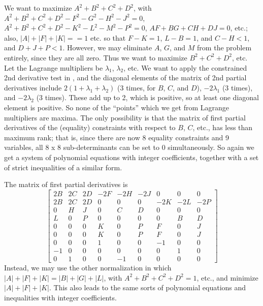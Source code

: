 We want to maximize $A^2+B^2+C^2+D^2$, with $A^2+B^2+C^2+D^2-F^2-G^2-H^2-J^2
= 0$, $A^2+B^2+C^2+D^2-K^2-L^2-M^2-P^2 = 0$, $AF+BG+CH+DJ= 0$, etc.;
also, $|A|+|F|+|K| = = 1$ etc.
so that $F-K = 1$, $L-B = 1$, and $C-H < 1$, and $D+J+P < 1$. However, we
may eliminate $A$, $G$, and $M$ from the problem entirely, since they are all
zero. Thus we want to maximize $B^2+C^2+D^2$, etc. Let the Lagrange
multipliers be $\lambda_1$, $\lambda_2$, etc. We want to apply the constrained
2nd derivative test in \cite{fleming1965}, and the diagonal elements of the
matrix of 2nd partial derivatives include $2(1 + \lambda_1 + \lambda_2)$
(3 times, for $B$, $C$, and $D$), $-2\lambda_1$ (3 times), and $-2\lambda_2$
(3 times).  These add up to 2, which is positive, so at
least one diagonal element is positive. So none of the ``points'' which we
get from Lagrange multipliers are maxima. The only possibility is that
the matrix of first partial derivatives of the (equality) constraints with
respect to $B$, $C$, etc., has less than maximum rank; that is, since there are
now 8 equality constraints and 9 variables, all 8 x 8 sub-determinants can
be set to 0 simultaneously. So again we get a system of polynomial
equations with integer coefficients, together with a set of strict
inequalities of a similar form.

The matrix of first partial derivatives is
\begin{equation*}
\left[
\begin{array}{rrrrrrrrr}
2B & 2C & 2D & -2F & -2H & -2J &   0 &   0 &   0 \\
2B & 2C & 2D &   0 &   0 &   0 & -2K & -2L & -2P \\
 0 &  H &  J &   0 &   C &   D &   0 &   0 &   0 \\
 L &  0 &  P &   0 &   0 &   0 &   0 &   B &   D \\
 0 &  0 &  0 &   K &   0 &   P &   F &   0 &   J \\
 0 &  0 &  0 &   K &   0 &   P &   F &   0 &   J \\
 0 &  0 &  0 &   1 &   0 &   0 &  -1 &   0 &   0 \\
-1 &  0 &  0 &   0 &   0 &   0 &   0 &   1 &   0 \\
 0 &  1 &  0 &   0 &  -1 &   0 &   0 &   0 &   0
\end{array}
\right]
\end{equation*}
Instead, we may use the other normalization in which $|A|+|F|+|K| =
|B|+|G|+|L|$, with $A^2+B^2+C^2+D^2 = 1$, etc., and minimize $|A|+|F|+|K|$.
This also leads to the same sorts of polynomial equations and inequalities
with integer coefficients.

